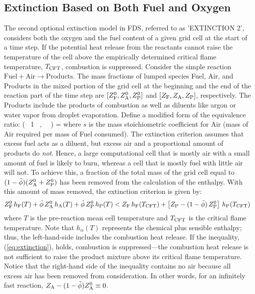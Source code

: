 \subsection{Extinction Based on Both Fuel and Oxygen}

The second optional extinction model in FDS, referred to as {\ct 'EXTINCTION 2'}, considers both the oxygen and the fuel content of a given grid cell at the start of a time step. If the potential heat release from the reactants cannot raise the temperature of the cell above the empirically determined critical flame temperature, $T_{\rm CFT}$, combustion is suppressed.  Consider the simple reaction $\mbox{Fuel} + \mbox{Air} \rightarrow \mbox{Products}$. The mass fractions of lumped species Fuel, Air, and Products in the mixed portion of the grid cell at the beginning and the end of the reaction part of the time step are $[Z_{\rm F}^0, Z_{\rm A}^0, Z_{\rm P}^0]$ and $[Z_{\rm F}, Z_{\rm A}, Z_{\rm P}]$, respectively. The Products include the products of combustion as well as diluents like argon or water vapor from droplet evaporation. Define a modified form of the equivalence ratio:
\be
   \label{eq:dza}
   \tilde{\phi} \equiv  \min \left( \, 1 \, , \,  \, \right) = 
\ee
where $s$ is the mass stoichiometric coefficient for Air (mass of Air required per mass of Fuel consumed). The extinction criterion assumes that excess fuel acts as a diluent, but excess air and a proportional amount of products do \emph{not}. Hence, a large computational cell that is mostly air with a small amount of fuel is likely to burn, whereas a cell that is mostly fuel with little air will not. To achieve this, a fraction of the total mass of the grid cell equal to $(1-\tilde{\phi}) (Z_{\rm A}^0+Z_{\rm P}^0)$ has been removed from the calculation of the enthalpy. With this amount of mass removed, the extinction criterion is given by:
\begin{equation}
\label{eq:extinction}
Z_{\rm F}^0 \, h_{\rm F}(T) + \tilde{\phi} \, Z_{\rm A}^0 \, h_{\rm A}(T) + \tilde{\phi} \, Z_{\rm P}^0 \, h_{\rm P}(T) <
Z_{\rm F} \, h_{\rm F}(T_{\rm CFT}) + \left[ Z_{\rm P} - (1-\tilde{\phi}) \, Z_{\rm P}^0 \right] \, h_{\rm P}(T_{\rm CFT})
\end{equation}
where $T$ is the pre-reaction mean cell temperature and $T_{\rm CFT}$ is the critical flame temperature. Note that $h_\alpha(T)$ represents the chemical plus sensible enthalpy; thus, the left-hand-side includes the combustion heat release.  If the inequality, (\ref{eq:extinction}), holds, combustion is suppressed---the combustion heat release is not sufficient to raise the product mixture above its critical flame temperature. Notice that the right-hand side of the inequality contains no air because all excess air has been removed from consideration. In other words, for an infinitely fast reaction, $Z_{\rm A}-(1-\tilde{\phi}) Z_{\rm A}^0 \equiv 0$.

